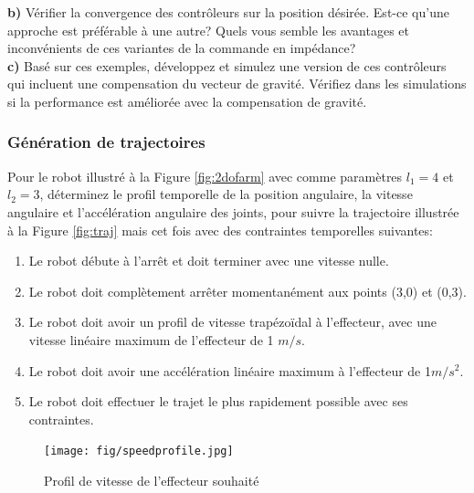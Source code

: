 \textbf{b)} Vérifier la convergence des contrôleurs sur la position désirée. Est-ce qu'une approche est préférable à une autre? Quels vous semble les avantages et inconvénients de ces variantes de la commande en impédance? 
\\

\textbf{c)} Basé sur ces exemples, développez et simulez une version de ces contrôleurs qui incluent une compensation du vecteur de gravité. Vérifiez dans les simulations si la performance est améliorée avec la compensation de gravité. 




\subsubsection{Génération de trajectoires}


Pour le robot illustré à la Figure \ref{fig:2dofarm} avec comme paramètres $l_1=4$ et $l_2 = 3$, déterminez le profil temporelle de la position angulaire, la vitesse angulaire et l'accélération angulaire des joints, pour suivre la trajectoire illustrée à la Figure \ref{fig:traj} mais cet fois avec des contraintes temporelles suivantes:
\begin{enumerate}
    \item Le robot débute à l'arrêt et doit terminer avec une vitesse nulle. 
    \item Le robot doit complètement arrêter momentanément aux points (3,0) et (0,3).
    \item Le robot doit avoir un profil de vitesse trapézoïdal à l'effecteur, avec une vitesse linéaire maximum de l'effecteur de 1 $m/s$. 
    \item Le robot doit avoir une accélération linéaire maximum à l'effecteur de 1$m/s^2$.
    \item Le robot doit effectuer le trajet le plus rapidement possible avec ses contraintes.
\end{enumerate}

\begin{figure}[htbp]
	\centering
		\texttt{[image: fig/speedprofile.jpg]}
	\caption{Profil de vitesse de l'effecteur souhaité}
	\label{fig:speedprofile}
\end{figure}

